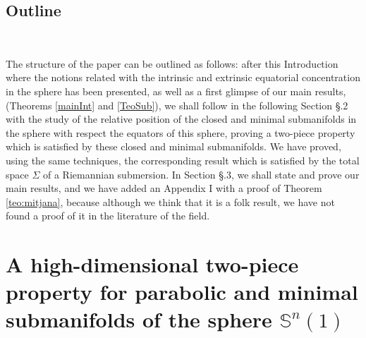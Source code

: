 \documentclass{amsart}
\theoremstyle{definition}
\theoremstyle{remark}
\begin{document}
\subsection{Outline}\

The structure of the paper can be outlined as follows: after this Introduction where the notions related with the intrinsic and extrinsic equatorial concentration in the sphere has been presented, as well as a first glimpse of our main results, (Theorems \ref{mainInt} and \ref{TeoSub}), we shall follow in the following Section \S.2 with the study of the relative position of the closed and minimal submanifolds in the sphere with respect the equators of this sphere, proving a two-piece property which is satisfied by these closed and minimal submanifolds. We have proved, using the same techniques, the corresponding result which is satisfied by the total space $\Sigma$ of a Riemannian submersion. In Section \S.3, we shall state and prove our main results, and we have added an Appendix I with a proof of Theorem \ref{teo:mitjana}, because although we think that it is a folk result, we have not found a proof of it in the literature of the field.





\section{A high-dimensional two-piece property for parabolic and minimal submanifolds of the sphere $\mathbb{S}^n(1)$ }\

\end{document}
